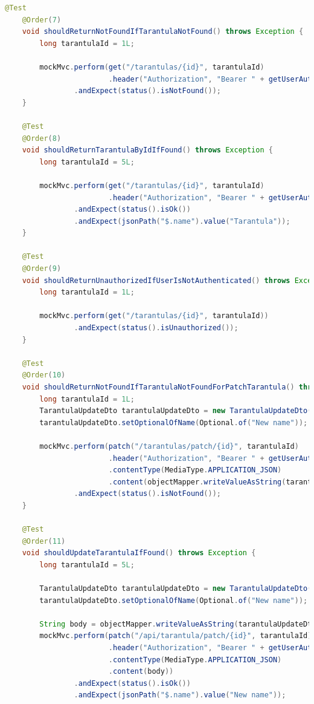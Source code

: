 \documentclass[a4paper,12pt,oneside]{article}
\begin{document}
\begin{lstlisting}[language=Java]
    @Test
    @Order(7)
    void shouldReturnNotFoundIfTarantulaNotFound() throws Exception {
        long tarantulaId = 1L;

        mockMvc.perform(get("/tarantulas/{id}", tarantulaId)
                        .header("Authorization", "Bearer " + getUserAuthToken()))
                .andExpect(status().isNotFound());
    }

    @Test
    @Order(8)
    void shouldReturnTarantulaByIdIfFound() throws Exception {
        long tarantulaId = 5L;

        mockMvc.perform(get("/tarantulas/{id}", tarantulaId)
                        .header("Authorization", "Bearer " + getUserAuthToken()))
                .andExpect(status().isOk())
                .andExpect(jsonPath("$.name").value("Tarantula"));
    }

    @Test
    @Order(9)
    void shouldReturnUnauthorizedIfUserIsNotAuthenticated() throws Exception {
        long tarantulaId = 1L;

        mockMvc.perform(get("/tarantulas/{id}", tarantulaId))
                .andExpect(status().isUnauthorized());
    }

    @Test
    @Order(10)
    void shouldReturnNotFoundIfTarantulaNotFoundForPatchTarantula() throws Exception {
        long tarantulaId = 1L;
        TarantulaUpdateDto tarantulaUpdateDto = new TarantulaUpdateDto();
        tarantulaUpdateDto.setOptionalOfName(Optional.of("New name"));

        mockMvc.perform(patch("/tarantulas/patch/{id}", tarantulaId)
                        .header("Authorization", "Bearer " + getUserAuthToken())
                        .contentType(MediaType.APPLICATION_JSON)
                        .content(objectMapper.writeValueAsString(tarantulaUpdateDto)))
                .andExpect(status().isNotFound());
    }

    @Test
    @Order(11)
    void shouldUpdateTarantulaIfFound() throws Exception {
        long tarantulaId = 5L;

        TarantulaUpdateDto tarantulaUpdateDto = new TarantulaUpdateDto();
        tarantulaUpdateDto.setOptionalOfName(Optional.of("New name"));

        String body = objectMapper.writeValueAsString(tarantulaUpdateDto);
        mockMvc.perform(patch("/api/tarantula/patch/{id}", tarantulaId)
                        .header("Authorization", "Bearer " + getUserAuthToken())
                        .contentType(MediaType.APPLICATION_JSON)
                        .content(body))
                .andExpect(status().isOk())
                .andExpect(jsonPath("$.name").value("New name"));


\end{lstlisting}
\end{document}
